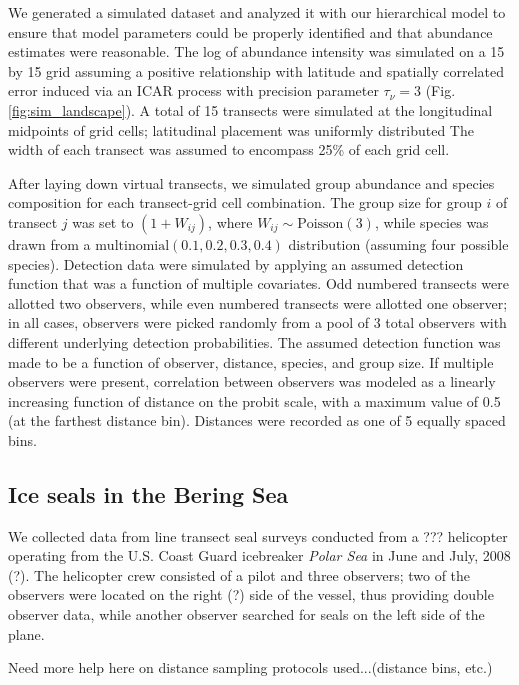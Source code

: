 \documentclass[10pt]{article}
\begin{document}
We generated a simulated dataset and analyzed it with our hierarchical model to ensure that model parameters could be properly identified and that abundance estimates were reasonable.  The log of abundance intensity was simulated on a 15 by 15 grid assuming a positive relationship with latitude and spatially correlated error induced via an ICAR process with precision parameter $\tau_\nu=3$ (Fig. \ref{fig:sim_landscape}).  A total of 15 transects were simulated at the longitudinal midpoints of grid cells; latitudinal placement was uniformly distributed   The width of each transect was assumed to encompass 25\% of each grid cell.

After laying down virtual transects, we simulated group abundance and species composition for each transect-grid cell combination.  The group size for group $i$ of transect $j$ was set to $(1+W_{ij})$, where $W_{ij} \sim \textrm{Poisson}(3)$, while species was drawn from a $\textrm{multinomial}(0.1,0.2,0.3,0.4)$ distribution (assuming four possible species).
Detection data were simulated by applying an assumed detection function that was a function of multiple covariates.  Odd numbered transects were allotted two observers, while even numbered transects were allotted one observer; in all cases, observers were picked randomly from a pool of 3 total observers with different underlying detection probabilities.  The assumed detection function was made to be a function of observer, distance, species, and group size.  If multiple observers were present, correlation between observers was modeled as a linearly increasing function of distance on the probit scale, with a maximum value of 0.5 (at the farthest distance bin).  Distances were recorded as one of 5 equally spaced bins.

\subsection*{Ice seals in the Bering Sea}

We collected data from line transect seal surveys conducted from a ??? helicopter operating from the U.S. Coast Guard icebreaker {\it Polar Sea} in June and July, 2008 (?).  The helicopter crew consisted of a pilot and three observers; two of the observers were located on the right (?) side of the vessel, thus providing double observer data, while another observer searched for seals on the left side of the plane.

Need more help here on distance sampling protocols used...(distance bins, etc.)
\end{document}
